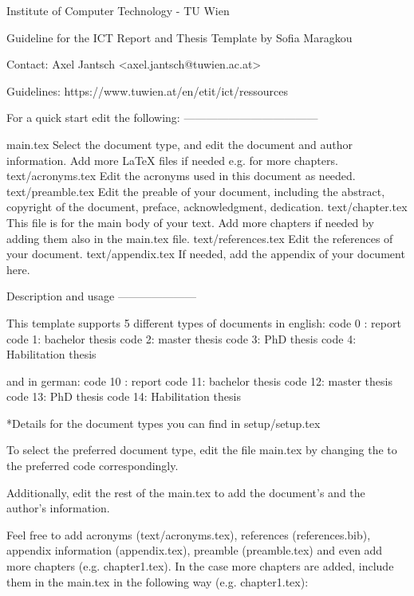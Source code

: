                 Institute of Computer Technology - TU Wien 
                
    Guideline for the ICT Report and Thesis Template by Sofia Maragkou

            Contact: Axel Jantsch <axel.jantsch@tuwien.ac.at>
            
            Guidelines: https://www.tuwien.at/en/etit/ict/ressources


For a quick start edit the following:
------------------------------------

main.tex              Select the document type, and edit the document and author                                   information. Add more LaTeX files if needed e.g. for more chapters.
text/acronyms.tex     Edit the acronyms used in this document as needed.
text/preamble.tex     Edit the preable of your document, including the abstract, copyright                         of the document, preface, acknowledgment, dedication.
text/chapter.tex      This file is for the main body of your text. Add more chapters if                            needed by adding them also in the main.tex file.  
text/references.tex   Edit the references of your document. 
text/appendix.tex     If needed, add the appendix of your document here.



Description and usage
---------------------

This template supports 5 different types of documents in english:
 code 0 : report
 code 1: bachelor thesis
 code 2: master thesis
 code 3: PhD thesis
 code 4: Habilitation thesis 

and in german: 
 code 10 : report
 code 11: bachelor thesis
 code 12: master thesis
 code 13: PhD thesis
 code 14: Habilitation thesis 

*Details for the document types you can find in setup/setup.tex


To select the preferred document type, edit the file main.tex by changing the \def\doctype{x} to the preferred code correspondingly. 

Additionally, edit the rest of the main.tex to add the document's and the author's information. 

Feel free to add acronyms (text/acronyms.tex), references (references.bib), appendix information (appendix.tex), preamble (preamble.tex) and even add more chapters (e.g. chapter1.tex).
In the case more chapters are added, include them in the main.tex in the following way (e.g. chapter1.tex):










